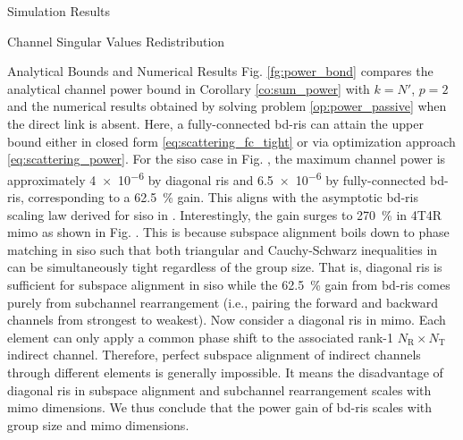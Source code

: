 \documentclass[journal]{IEEEtran}
\begin{document}
\begin{section}{Simulation Results}
\begin{subsection}{Channel Singular Values Redistribution}
\begin{subsubsection}{Analytical Bounds and Numerical Results}
			Fig. \ref{fg:power_bond} compares the analytical channel power bound in Corollary \ref{co:sum_power} with $k=N'$, $p=2$ and the numerical results obtained by solving problem \eqref{op:power_passive} when the direct link is absent.
			Here, a fully-connected \gls{bd}-\gls{ris} can attain the upper bound either in closed form \eqref{eq:scattering_fc_tight} or via optimization approach \eqref{eq:scattering_power}.
			For the \gls{siso} case in Fig. , the maximum channel power is approximately \num{4e-6} by diagonal \gls{ris} and \num{6.5e-6} by fully-connected \gls{bd}-\gls{ris}, corresponding to a \qty{62.5}{\percent} gain.
			This aligns with the asymptotic \gls{bd}-\gls{ris} scaling law derived for \gls{siso} in \cite{Shen2020a}.
			Interestingly, the gain surges to \qty{270}{\percent} in 4T4R \gls{mimo} as shown in Fig. .
			This is because subspace alignment boils down to phase matching in \gls{siso} such that both triangular and Cauchy-Schwarz inequalities in \cite[(50)]{Shen2020a} can be simultaneously tight regardless of the group size.
			That is, diagonal \gls{ris} is sufficient for subspace alignment in \gls{siso} while the \qty{62.5}{\percent} gain from \gls{bd}-\gls{ris} comes purely from subchannel rearrangement (i.e., pairing the forward and backward channels from strongest to weakest).
			Now consider a diagonal \gls{ris} in \gls{mimo}.
			Each element can only apply a common phase shift to the associated rank-1 $N_\mathrm{R} \times N_\mathrm{T}$ indirect channel.
			Therefore, perfect subspace alignment of indirect channels through different elements is generally impossible.
			It means the disadvantage of diagonal \gls{ris} in subspace alignment and subchannel rearrangement scales with \gls{mimo} dimensions.
			We thus conclude that the power gain of \gls{bd}-\gls{ris} scales with group size and \gls{mimo} dimensions.
		\end{subsubsection}


\end{subsection}
\end{section}
\end{document}
